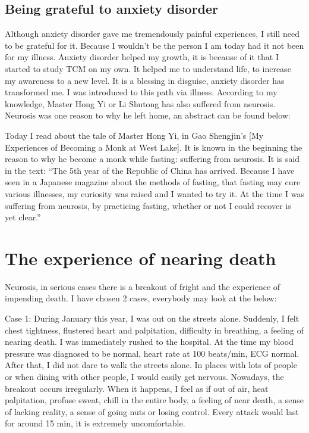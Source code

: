 \documentclass[
]{book}
\begin{document}
\hypertarget{being-grateful-to-anxiety-disorder}{%
\subsection{Being grateful to anxiety disorder}\label{being-grateful-to-anxiety-disorder}}

Although anxiety disorder gave me tremendously painful experiences, I still need to be grateful for it. Because I wouldn't be the person I am today had it not been for my illness. Anxiety disorder helped my growth, it is because of it that I started to study TCM on my own. It helped me to understand life, to increase my awareness to a new level. It is a blessing in disguise, anxiety disorder has transformed me. I was introduced to this path via illness. According to my knowledge, Master Hong Yi or Li Shutong has also suffered from neurosis. Neurosis was one reason to why he left home, an abstract can be found below:

Today I read about the tale of Master Hong Yi, in Gao Shengjin's {[}My Experiences of Becoming a Monk at West Lake{]}. It is known in the beginning the reason to why he become a monk while fasting: suffering from neurosis. It is said in the text: ``The 5th year of the Republic of China has arrived. Because I have seen in a Japanese magazine about the methods of fasting, that fasting may cure various illnesses, my curiosity was raised and I wanted to try it. At the time I was suffering from neurosis, by practicing fasting, whether or not I could recover is yet clear.''

\hypertarget{the-experience-of-nearing-death}{%
\section{The experience of nearing death}\label{the-experience-of-nearing-death}}

Neurosis, in serious cases there is a breakout of fright and the experience of impending death. I have chosen 2 cases, everybody may look at the below:

Case 1: During January this year, I was out on the streets alone. Suddenly, I felt chest tightness, flustered heart and palpitation, difficulty in breathing, a feeling of nearing death. I was immediately rushed to the hospital. At the time my blood pressure was diagnosed to be normal, heart rate at 100 beats/min, ECG normal. After that, I did not dare to walk the streets alone. In places with lots of people or when dining with other people, I would easily get nervous. Nowadays, the breakout occurs irregularly. When it happens, I feel as if out of air, heat palpitation, profuse sweat, chill in the entire body, a feeling of near death, a sense of lacking reality, a sense of going nuts or losing control. Every attack would last for around 15 min, it is extremely uncomfortable.
\end{document}
